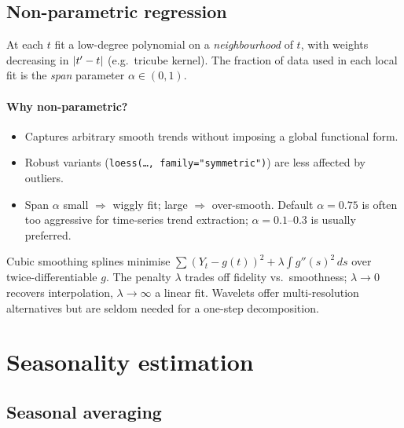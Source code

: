 \subsection{Non-parametric regression}

\begin{defbox}
At each $t$ fit a low-degree polynomial on a \emph{neighbourhood} of
$t$, with weights decreasing in $\left\lvert t' - t \right\rvert$ (e.g.\ tricube kernel).
The fraction of data used in each local fit is the \emph{span}
parameter $\alpha \in (0, 1)$.
\end{defbox}

\paragraph{Why non-parametric?}
\begin{itemize}
  \item Captures arbitrary smooth trends without imposing a global
        functional form.
  \item Robust variants (\texttt{loess(\dots, family="symmetric")}) are
        less affected by outliers.
  \item Span $\alpha$ small $\Rightarrow$ wiggly fit; large $\Rightarrow$
        over-smooth. Default $\alpha = 0.75$ is often too aggressive
        for time-series trend extraction; $\alpha = 0.1$--$0.3$ is
        usually preferred.
\end{itemize}

\begin{rembox}
Cubic smoothing splines minimise
$\sum (Y_t - g(t))^2 + \lambda \int g''(s)^2\,ds$ over twice-differentiable
$g$. The penalty $\lambda$ trades off fidelity vs.\ smoothness;
$\lambda \to 0$ recovers interpolation, $\lambda \to \infty$ a linear
fit. Wavelets offer multi-resolution alternatives but are seldom needed
for a one-step decomposition.
\end{rembox}

\section{Seasonality estimation}
\label{sec:seasonality}

\subsection{Seasonal averaging}

